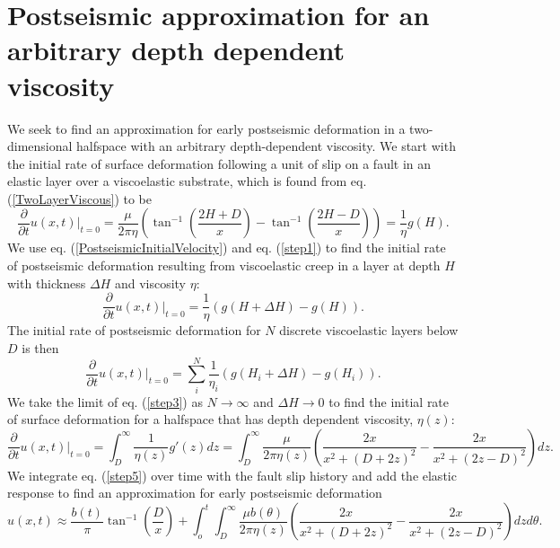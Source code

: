 \documentclass[extra]{gji}
\begin{document}
\section{Postseismic approximation for an arbitrary depth dependent viscosity}
We seek to find an approximation for early postseismic deformation in
a two-dimensional halfspace with an arbitrary depth-dependent
viscosity. We start with the initial rate of surface deformation
following a unit of slip on a fault in an elastic layer over a
viscoelastic substrate, which is found from
eq. (\ref{TwoLayerViscous}) to be
\begin{equation}\label{step1}
  \frac{\partial}{\partial t}u(x,t)\big|_{t=0} = 
    \frac{\mu}{2\pi\eta}\left(\tan^{-1}\left(\frac{2H + D}{x}\right) - 
                              \tan^{-1}\left(\frac{2H - D}{x}\right)\right) = \frac{1}{\eta}g(H).
\end{equation}
We use eq. (\ref{PostseismicInitialVelocity}) and eq. (\ref{step1}) to
find the initial rate of postseismic deformation resulting from
viscoelastic creep in a layer at depth $H$ with thickness $\Delta H$
and viscosity $\eta$:
\begin{equation}\label{step2}
  \frac{\partial}{\partial t}u(x,t)\big|_{t=0} = \frac{1}{\eta}(g(H+\Delta H) - g(H)).
\end{equation}
The initial rate of postseismic deformation for $N$ discrete
viscoelastic layers below $D$ is then
\begin{equation}\label{step3}
  \frac{\partial}{\partial t}u(x,t)\big|_{t=0} = \sum_i^N\frac{1}{\eta_i}(g(H_i+\Delta H) - g(H_i)).
\end{equation}\label{step4}
We take the limit of eq. (\ref{step3}) as $N\to\infty$ and $\Delta
H\to 0$ to find the initial rate of surface deformation for a
halfspace that has depth dependent viscosity, $\eta(z)$:
\begin{equation}\label{step5}
  \frac{\partial}{\partial t}u(x,t)\big|_{t=0} = \int_D^\infty \frac{1}{\eta(z)}g'(z)dz =
  \int_D^\infty \frac{\mu}{2\pi\eta(z)}
                     \left(\frac{2x}{x^2 + \left(D + 2z\right)^2} - 
                     \frac{2x}{x^2 + \left(2z - D\right)^2}\right)
                     dz.
\end{equation}
We integrate eq. (\ref{step5}) over time with the
fault slip history and add the elastic response to find an
approximation for early postseismic deformation
\begin{equation}
u(x,t) \approx \frac{b(t)}{\pi}\tan^{-1}(\frac{D}{x}) + 
               \int_o^t\int_D^\infty \frac{\mu b(\theta)}{2\pi\eta(z)}
                                    \left(\frac{2x}{x^2 + \left(D + 2z\right)^2} - 
                                    \frac{2x}{x^2 + \left(2z - D\right)^2}\right)
                                    dz d\theta.
\end{equation}
\end{document}
